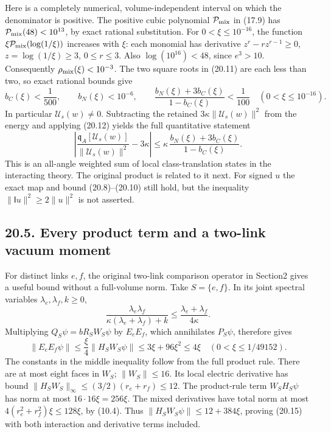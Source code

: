 \documentclass[
]{article}
\begin{document}
Here is a completely numerical, volume-independent interval on which the
denominator is positive. The positive cubic polynomial
\(\mathcal P_{\rm mix}\) in (17.9) has
\(\mathcal P_{\rm mix}(48)<10^{13}\), by exact rational substitution.
For \(0<\xi\le10^{-16}\), the function
\(\xi\mathcal P_{\rm mix}(\log(1/\xi))\) increases with \(\xi\): each
monomial has derivative \(z^r-rz^{r-1}\ge0\), \(z=\log(1/\xi)\ge3\),
\(0\le r\le3\). Also \(\log(10^{16})<48\), since \(e^3>10\).
Consequently \(\rho_{\rm mix}(\xi)<10^{-3}\). The two square roots in
(20.11) are each less than two, so exact rational bounds give \[
b_C(\xi)<\frac1{500},\qquad b_N(\xi)<10^{-6},\qquad
\frac{b_N(\xi)+3b_C(\xi)}{1-b_C(\xi)}<\frac1{100}
 \quad(0<\xi\le10^{-16}).
                                                               \tag{20.13}
\] In particular \(\mathcal U_s(w)\ne0\). Subtracting the retained
\(3\kappa\|\mathcal U_s(w)\|^2\) from the energy and applying (20.12)
yields the full quantitative statement \[
\left|
\frac{\mathfrak q_A[\mathcal U_s(w)]}{\|\mathcal U_s(w)\|^2}
-3\kappa\right|
\le\kappa\,\frac{b_N(\xi)+3b_C(\xi)}{1-b_C(\xi)} .
                                                               \tag{20.14}
\] This is an all-angle weighted sum of local class-translation states
in the interacting theory. The original product is related to it next.
For signed \(u\) the exact map and bound (20.8)--(20.10) still hold, but
the inequality \(\|\mathsf Iu\|^2\ge2\|u\|^2\) is not asserted.

\subsection{20.5. Every product term and a two-link vacuum
moment}\label{every-product-term-and-a-two-link-vacuum-moment}

For distinct links \(e,f\), the original two-link comparison operator in
Section2 gives a useful bound without a full-volume norm. Take
\(S=\{e,f\}\). In its joint spectral variables
\(\lambda_e,\lambda_f,k\ge0\), \[
\frac{\lambda_e\lambda_f}
 {\kappa(\lambda_e+\lambda_f)+k}
\le\frac{\lambda_e+\lambda_f}{4\kappa}.
\] Multiplying \(Q_S\psi=bR_SW_S\psi\) by \(E_eE_f\), which annihilates
\(P_S\psi\), therefore gives \[
\|E_eE_f\psi\|\le\frac{\xi}{4}\|H_SW_S\psi\|
 \le3\xi+96\xi^2\le4\xi\quad(0<\xi\le1/49152).
                                                               \tag{20.15}
\] The constants in the middle inequality follow from the full product
rule. There are at most eight faces in \(W_S\); \(\|W_S\|\le16\). Its
local electric derivative has bound
\(\|H_SW_S\|_\infty\le(3/2)(r_e+r_f)\le12\). The product-rule term
\(W_SH_S\psi\) has norm at most \(16\cdot16\xi=256\xi\). The mixed
derivatives have total norm at most \(4(r_e^2+r_f^2)\xi\le128\xi\), by
(10.4). Thus \(\|H_SW_S\psi\|\le12+384\xi\), proving (20.15) with both
interaction and derivative terms included.
\end{document}
